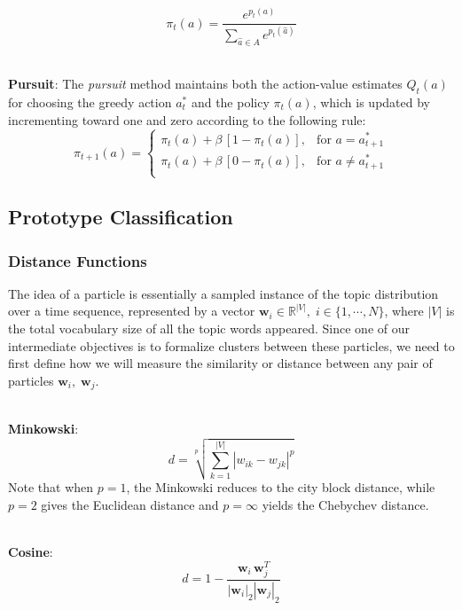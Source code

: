 \documentclass[conference]{IEEEtran}
\begin{document}
\begin{equation*}
	\pi_t(a) = \frac{e^{p_t(a)}}{\sum_{\hat{a} \in A}e^{p_t(\hat{a})}}
\end{equation*}

\-\\
\textbf{Pursuit}: The \emph{pursuit} method maintains both the action-value estimates $Q_t(a)$ for choosing the greedy action $a^*_t$ and the policy $\pi_t(a)$, which is updated by incrementing toward one and zero according to the following rule:
\begin{equation*}
	\pi_{t+1}(a) = 
	\begin{cases}
		\pi_{t}(a) + \beta\,\left[1-\pi_{t}(a)\right],& \text{for } a = a^*_{t+1}\\
		\pi_{t}(a) + \beta\,\left[0-\pi_{t}(a)\right],& \text{for } a \neq a^*_{t+1}\\
	\end{cases}
\end{equation*}

\subsection{Prototype Classification}


\subsubsection{Distance Functions}
The idea of a particle is essentially a sampled instance of the topic distribution over a time sequence, represented by a vector $\mathbf{w}_i\in \mathbb{R}^{|V|},\; i \in \{1,\cdots,N\}$, where $|V|$ is the total vocabulary size of all the topic words appeared. Since one of our intermediate objectives is to formalize clusters between these particles, we need to first define how we will measure the similarity or distance between any pair of particles $\mathbf{w}_i,\; \mathbf{w}_j$. 

\-\\
\textbf{Minkowski}: 
\begin{equation*}
	d = \sqrt[p]{\sum_{k=1}^{|V|}|w_{ik} - w_{jk}|^p}
\end{equation*}
 Note that when $p=1$, the Minkowski reduces to the city block distance, while $p=2$ gives the Euclidean distance and $p=\infty$ yields the Chebychev distance.

\-\\
\textbf{Cosine}: 
\begin{equation*}
d = 1 - \frac{\mathbf{w}_i\,\mathbf{w}_j^T}{|\mathbf{w}_i|_2|\mathbf{w}_j|_2}
\end{equation*}
\end{document}
